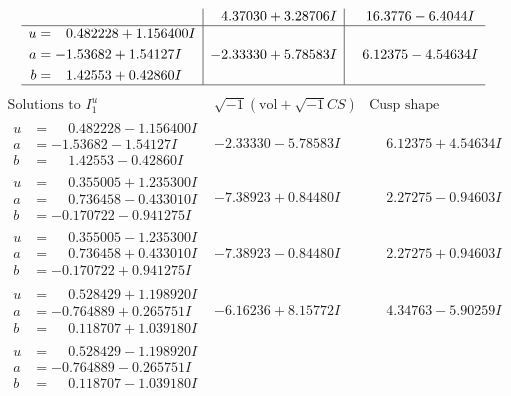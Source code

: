 \documentclass[1p]{elsarticle_modified}
\theoremstyle{definition}
\newcommand{\I}{\sqrt{-1}}
\begin{document}
$$\begin{array}{c|c|c}
 & \phantom{-}4.37030 + 3.28706 I & \phantom{-}16.3776 - 6.4044 I \\ \hline\begin{aligned}
u &= \phantom{-}0.482228 + 1.156400 I \\
a &= -1.53682 + 1.54127 I \\
b &= \phantom{-}1.42553 + 0.42860 I\end{aligned}
 & -2.33330 + 5.78583 I & \phantom{-}6.12375 - 4.54634 I\\
 \hline 
 \end{array}$$\newpage$$\begin{array}{c|c|c}  
\text{Solutions to }I^u_{1}& \I (\text{vol} + \sqrt{-1}CS) & \text{Cusp shape}\\
 \hline 
\begin{aligned}
u &= \phantom{-}0.482228 - 1.156400 I \\
a &= -1.53682 - 1.54127 I \\
b &= \phantom{-}1.42553 - 0.42860 I\end{aligned}
 & -2.33330 - 5.78583 I & \phantom{-}6.12375 + 4.54634 I \\ \hline\begin{aligned}
u &= \phantom{-}0.355005 + 1.235300 I \\
a &= \phantom{-}0.736458 - 0.433010 I \\
b &= -0.170722 - 0.941275 I\end{aligned}
 & -7.38923 + 0.84480 I & \phantom{-}2.27275 - 0.94603 I \\ \hline\begin{aligned}
u &= \phantom{-}0.355005 - 1.235300 I \\
a &= \phantom{-}0.736458 + 0.433010 I \\
b &= -0.170722 + 0.941275 I\end{aligned}
 & -7.38923 - 0.84480 I & \phantom{-}2.27275 + 0.94603 I \\ \hline\begin{aligned}
u &= \phantom{-}0.528429 + 1.198920 I \\
a &= -0.764889 + 0.265751 I \\
b &= \phantom{-}0.118707 + 1.039180 I\end{aligned}
 & -6.16236 + 8.15772 I & \phantom{-}4.34763 - 5.90259 I \\ \hline\begin{aligned}
u &= \phantom{-}0.528429 - 1.198920 I \\
a &= -0.764889 - 0.265751 I \\
b &= \phantom{-}0.118707 - 1.039180 I\end{aligned}

\end{array}$$
\end{document}
